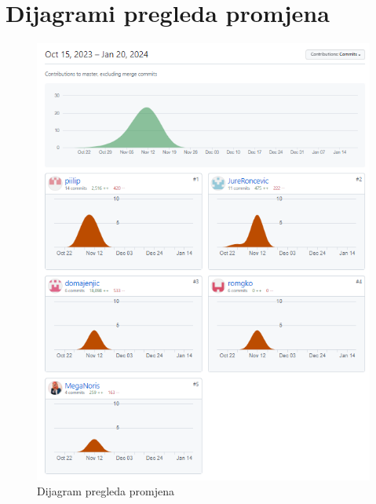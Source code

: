 \begin{longtblr}[
					label=none,
				]
				

			\end{longtblr}
					
					
		\eject
		\section*{Dijagrami pregleda promjena}
		
		\begin{figure}[H]
			\includegraphics[width=\textwidth]{slike/aktivnost.png} %
			\centering
			\caption{Dijagram pregleda promjena}
			\label{fig:dijagramstanja}
		\end{figure}
		
	